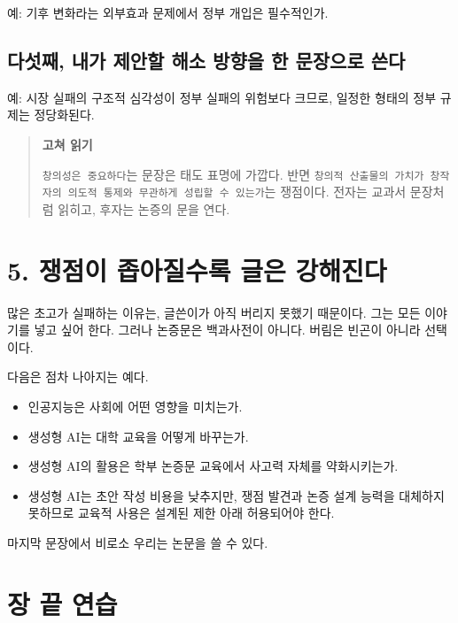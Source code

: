 예: 기후 변화라는 외부효과 문제에서 정부 개입은 필수적인가.

\subsection{다섯째, 내가 제안할 해소 방향을 한 문장으로 쓴다}\label{uxb2e4uxc12fuxc9f8-uxb0b4uxac00-uxc81cuxc548uxd560-uxd574uxc18c-uxbc29uxd5a5uxc744-uxd55c-uxbb38uxc7a5uxc73cuxb85c-uxc4f4uxb2e4}

예: 시장 실패의 구조적 심각성이 정부 실패의 위험보다 크므로, 일정한 형태의 정부 규제는 정당화된다.

\begin{quote}
\textbf{고쳐 읽기}

\texttt{창의성은\ 중요하다}는 문장은 태도 표명에 가깝다. 반면 \texttt{창의적\ 산출물의\ 가치가\ 창작자의\ 의도적\ 통제와\ 무관하게\ 성립할\ 수\ 있는가}는 쟁점이다. 전자는 교과서 문장처럼 읽히고, 후자는 논증의 문을 연다.
\end{quote}

\section{5. 쟁점이 좁아질수록 글은 강해진다}\label{5-uxc7c1uxc810uxc774-uxc881uxc544uxc9c8uxc218uxb85d-uxae00uxc740-uxac15uxd574uxc9c4uxb2e4}

많은 초고가 실패하는 이유는, 글쓴이가 아직 버리지 못했기 때문이다. 그는 모든 이야기를 넣고 싶어 한다. 그러나 논증문은 백과사전이 아니다. 버림은 빈곤이 아니라 선택이다.

다음은 점차 나아지는 예다.

\begin{itemize}
\tightlist
\item
  인공지능은 사회에 어떤 영향을 미치는가.
\item
  생성형 AI는 대학 교육을 어떻게 바꾸는가.
\item
  생성형 AI의 활용은 학부 논증문 교육에서 사고력 자체를 약화시키는가.
\item
  생성형 AI는 초안 작성 비용을 낮추지만, 쟁점 발견과 논증 설계 능력을 대체하지 못하므로 교육적 사용은 설계된 제한 아래 허용되어야 한다.
\end{itemize}

마지막 문장에서 비로소 우리는 논문을 쓸 수 있다.

\section{장 끝 연습}\label{uxc7a5-uxb05d-uxc5f0uxc2b5-2}

